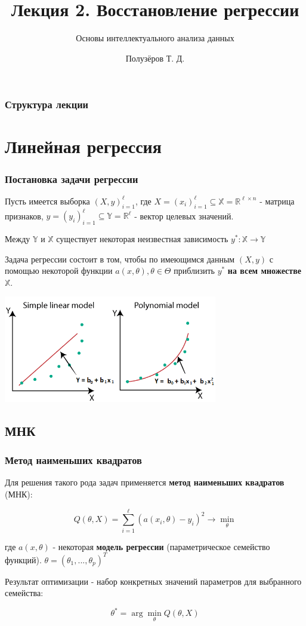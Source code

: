 \documentclass{beamer}
\title[Восстановление регрессии]{Лекция 2. Восстановление регрессии}
\subtitle{Основы интеллектуального анализа данных}
\author{Полузёров Т. Д.}
\institute{БГУ ФПМИ}
\date{}
\begin{document}
	
	\begin{frame}
		\titlepage
	\end{frame}
	
	
	\begin{center}
		\frametitle{Структура лекции}
		\tableofcontents	
	\end{center}
	
	
	\section{Линейная регрессия}
	
	
	\begin{frame}
		\frametitle{Постановка задачи регрессии}
		Пусть имеется выборка $(X, y)_{i=1}^{\ell}$, где $X = (x_i)_{i=1}^{\ell} \subseteq \mathbb{X} = \mathbb{R}^{\ell \times n}$ - матрица признаков, $y = (y_i)_{i=1}^{\ell}\subseteq \mathbb{Y} = \mathbb{R}^{\ell}$ - вектор целевых значений.
		
		Между $\mathbb{Y}$ и $\mathbb{X}$ существует некоторая неизвестная зависимость $y^{*}: \mathbb{X} \to \mathbb{Y}$
		
		\vspace{5pt}
		
		Задача регрессии состоит в том, чтобы по имеющимся данным $(X, y)$ с помощью некоторой функции $a(x, \theta), \theta \in \Theta$ приблизить $y^{*}$ \textbf{на всем множестве} $\mathbb{X}$.
		
		\centering
		\includegraphics[width=0.7\textwidth]{img/regr_ex.png}
	\end{frame}
	
	
	\subsection{МНК}
	
	
	\begin{frame}
		\frametitle{Метод наименьших квадратов}
		Для решения такого рода задач применяется \textbf{метод наименьших квадратов} (МНК):
		
		$$
		Q(\theta, X) = \sum_{i=1}^{\ell} (a(x_i, \theta) - y_i)^{2} \to \min_{\theta}
		$$
		
		где $a(x, \theta)$ - некоторая \textbf{модель регрессии} (параметрическое семейство функций). $\theta = (\theta_1, ..., \theta_p)^{T}$
		
		\vspace{15pt}
		
		Результат оптимизации - набор конкретных значений параметров для выбранного семейства: 
		
		$$
		\theta^{*} = \arg \min_{\theta} Q(\theta, X)
		$$		
	\end{frame}
\end{document}
